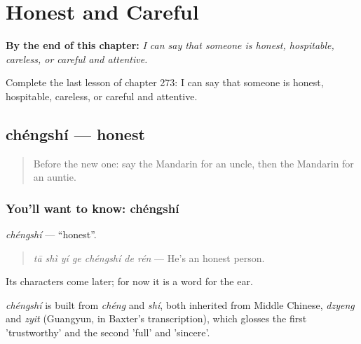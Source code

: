 
\chapter{Honest and Careful}
\label{ch:zh-honest-and-careful}

\begin{chapteropening}
\textbf{By the end of this chapter:} \emph{I can say that someone is honest, hospitable, careless, or careful and attentive.}

Complete the last lesson of chapter 273: I can say that someone is honest, hospitable, careless, or careful and attentive.
\end{chapteropening}

\section[chéngshí]{chéngshí — honest}

\label{lesson:ZH-C273-chengshi}



\begin{quote}
Before the new one: say the Mandarin for an uncle, then the Mandarin for an auntie.
\end{quote}

\subsection*{You'll want to know: chéngshí}
\emph{chéngshí} — \textquotedblleft{}honest\textquotedblright{}.

\begin{quote}
\emph{tā shì yí ge chéngshí de rén} — He's an honest person.
\end{quote}

Its characters come later; for now it is a word for the ear.

\begin{cousinweb}
\emph{chéngshí} is built from \emph{chéng} and \emph{shí}, both inherited from Middle Chinese, \emph{dzyeng} and \emph{zyit} (Guangyun, in Baxter's transcription), which glosses the first 'trustworthy' and the second 'full' and 'sincere'.
\end{cousinweb}

